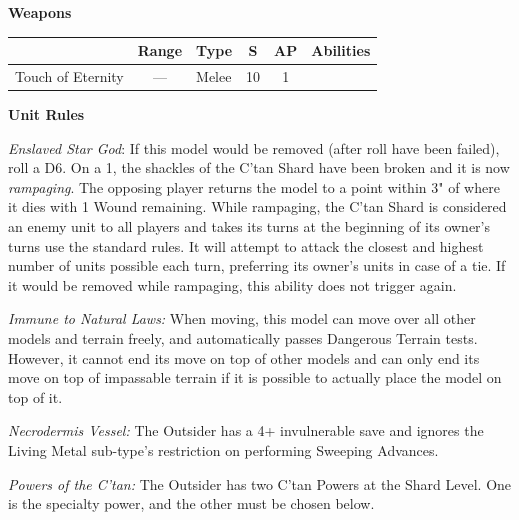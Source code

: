 \begin{minipage}[t]{0.72\textwidth}
	\vspace*{2em}
	\textbf{Weapons}
	
	\begin{tabular}{L{90 pt} c C{40pt} *{2}{c} >{\raggedright\arraybackslash}p{130pt}}
		& Range & Type & S & AP & Abilities \\
		\hline
		Touch of Eternity & — & Melee & 10 & 1 &  \\
	\end{tabular}
	
	\vspace*{2em}
	\textbf{Unit Rules}
	
	\textit{Enslaved Star God}: If this model would be removed (after  roll have been failed), roll a D6. On a 1, the shackles of the C'tan Shard have been broken and it is now \textit{rampaging}. The opposing player returns the model to a point within 3" of where it dies with 1 Wound remaining. While rampaging, the C'tan Shard is considered an enemy unit to all players and takes its turns at the beginning of its owner's turns use the standard rules. It will attempt to attack the closest and highest number of units possible each turn, preferring its owner's units in case of a tie. If it would be removed while rampaging, this ability does not trigger again.
	
	\textit{Immune to Natural Laws:} When moving, this model can move over all other models and terrain freely, and automatically passes Dangerous Terrain tests. However, it cannot end its move on top of other models and can only end its move on top of impassable terrain if it is possible to actually place the model on top of it.
	
	\textit{Necrodermis Vessel:} The Outsider has a 4+ invulnerable save and ignores the Living Metal sub-type's restriction on performing Sweeping Advances.
		
	\textit{Powers of the C'tan:} The Outsider has two C'tan Powers at the Shard Level. One is the  specialty power, and the other must be chosen below.
		

\end{minipage}
